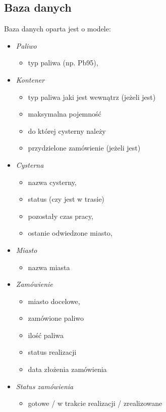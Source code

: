 \documentclass[11pt,a4paper,oneside]{mwart}
\begin{document}
\subsection{Baza danych}
Baza danych oparta jest o modele:
\begin{itemize}
  \item \emph{Paliwo} 
    \begin{itemize}
      \item typ paliwa (np. Pb95),
    \end{itemize}
    \item \emph{Kontener}  
          \begin{itemize}
            \item typ paliwa jaki jest wewnątrz (jeżeli jest)
            \item maksymalna pojemność
            \item do której cysterny należy
            \item przydzielone zamówienie (jeżeli jest)
    \end{itemize}
      \item \emph{Cysterna}  
            \begin{itemize}
      \item nazwa cysterny,
      \item status (czy jest w trasie)
      \item pozostały czas pracy,
      \item ostanie odwiedzone miasto,
    \end{itemize}
    \item \emph{Miasto} 
          \begin{itemize}
      \item nazwa miasta
    \end{itemize}
    \item \emph{Zamówienie}  
    \begin{itemize}
      \item miasto docelowe,
      \item zamówione paliwo
      \item ilość paliwa
      \item status realizacji
      \item data złożenia zamówienia
    \end{itemize}
    \item \emph{Status zamówienia}  
    \begin{itemize}
      \item gotowe / w trakcie realizacji / zrealizowane

\end{itemize}
\end{itemize}
\end{document}
